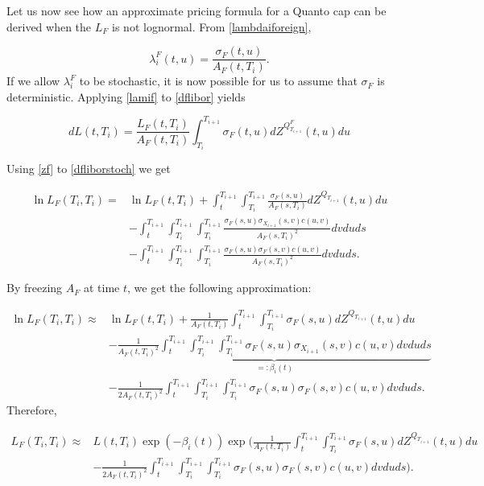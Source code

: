 \documentclass[11pt]{article}
\begin{document}
Let us now see how an approximate pricing formula for a Quanto cap can be derived when the $L_F$ is not lognormal. From \eqref{lambdaiforeign},

\begin{equation}\label{lamif}
    \lambda_i^F(t,u)=\frac{\sigma_F(t,u)}{A_F(t,T_i)}. 
\end{equation}
If we allow $\lambda_i^F$ to be stochastic, it is now possible for us to assume that $\sigma_F$ is deterministic. Applying \eqref{lamif} to \eqref{dflibor} yields

\begin{equation}\label{dfliborstoch}
dL(t,T_i)=\frac{L_F(t,T_i)}{A_F(t,T_i)}\int_{T_i}^{T_{i+1}}\sigma_F(t,u)dZ^{Q^F_{T_{i+1}}}(t,u)du
\end{equation}

Using \eqref{zf} to \eqref{dfliborstoch} we get

\begin{equation}
\begin{split}
        \ln L_F(T_i,T_i)=&\ln L_F(t,T_i)+\int_t^{T_{i+1}}\int_{T_i}^{T_{i+1}}\frac{\sigma_F(s,u)}{A_F(s,T_i)}dZ^{Q_{T_{i+1}}}(t,u)du\\&-\int_t^{T_{i+1}}\int_{T_i}^{T_{i+1}}\int_{T_i}^{T_{i+1}}\frac{\sigma_F(s,u)\sigma_{X_{i+1}}(s,v)c(u,v)}{A_F(s,T_i)^2}dvduds\\
        &-\int_t^{T_{i+1}}\int_{T_i}^{T_{i+1}}\int_{T_i}^{T_{i+1}}\frac{\sigma_F(s,u)\sigma_{F}(s,v)c(u,v)}{A_F(s,T_i)^2}dvduds. 
\end{split}
\end{equation}

By freezing $A_F$ at time $t$, we get the following approximation:

\begin{equation}\label{beta}
\begin{split}
        \ln L_F(T_i,T_i)\approx&\ln L_F(t,T_i)+\frac{1}{A_F(t,T_i)}\int_t^{T_{i+1}}\int_{T_i}^{T_{i+1}}\sigma_F(s,u)dZ^{Q_{T_{i+1}}}(t,u)du\\&-
\underbrace{\frac{1}{A_F(t,T_i)^2}\int_t^{T_{i+1}}\int_{T_i}^{T_{i+1}}\int_{T_i}^{T_{i+1}}\sigma_F(s,u)\sigma_{X_{i+1}}(s,v)c(u,v)dvduds}_{=:\beta_i(t)}
\\
        &-\frac{1}{2A_F(t,T_i)^2}\int_t^{T_{i+1}}\int_{T_i}^{T_{i+1}}\int_{T_i}^{T_{i+1}}\sigma_F(s,u)\sigma_{F}(s,v)c(u,v)dvduds. 
\end{split}
\end{equation}
Therefore, 

\begin{equation}\label{logbeta}
    \begin{split}
        L_F(T_i,T_i)\approx&L(t,T_i)\exp\left(-\beta_i(t)\right)\exp\Big(\frac{1}{A_F(t,T_i)}\int_t^{T_{i+1}}\int_{T_i}^{T_{i+1}}\sigma_F(s,u)dZ^{Q_{T_{i+1}}}(t,u)du\\
        &-\frac{1}{2A_F(t,T_i)^2}\int_t^{T_{i+1}}\int_{T_i}^{T_{i+1}}\int_{T_i}^{T_{i+1}}\sigma_F(s,u)\sigma_{F}(s,v)c(u,v)dvduds\Bigg).
    \end{split}
\end{equation}
\end{document}
